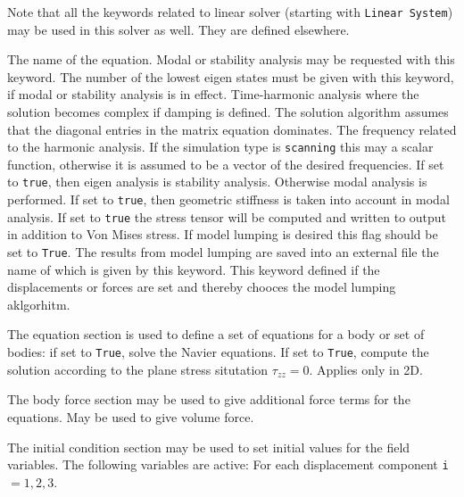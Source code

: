 \sifbegin

Note that all the keywords related to linear solver (starting
with {\tt Linear System})
may be used in this solver as well.  They are defined elsewhere. 

\sifbegin
{} 
The name of the equation.
Modal or stability analysis may be requested with this keyword.
The number of the lowest eigen states must be given with this keyword,
if modal or stability analysis is in effect.
Time-harmonic analysis where the solution becomes complex if damping is defined. 
The solution algorithm assumes that the diagonal entries in the matrix equation dominates.
The frequency related to the harmonic analysis. If the simulation type is \texttt{scanning} 
this may a scalar function, otherwise it is assumed to be a vector of the desired frequencies.
If set to {\tt{true}}, then eigen analysis is stability analysis.
Otherwise modal analysis is performed.
If set to {\tt{true}}, then geometric stiffness is taken into account in modal analysis.
If set to {\tt{true}} the stress tensor will be computed and written to
output in addition to Von Mises stress.
If model lumping is desired this flag should be set to \texttt{True}.
The results from model lumping are saved into an external file the 
name of which is given by this keyword.
This keyword defined if the displacements or forces are set and thereby chooces the 
model lumping aklgorhitm. 
\sifend

The equation section is used to define a set of equations for a body or set of bodies:
\sifbegin
{} if set to {\tt True}, solve the Navier equations.
 If set to {\tt True}, compute the solution
according to the plane stress situtation $\tau_{zz}=0$. Applies only in 2D.
\sifend

The body force section may be used to give additional force terms for the equations.
\sifbegin
{} May be used to give volume force.
\sifend

The initial condition section may be used to set initial values for the field
variables. The following variables are active:
\sifbegin
{} 
For each displacement component {\tt i}$=1,2,3$.
\sifend

